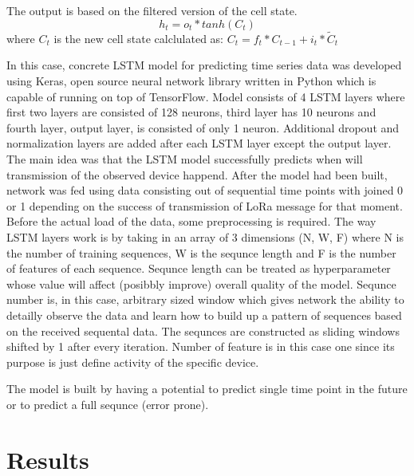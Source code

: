 \documentclass[11pt, a4paper]{article} %
\begin{document}
\begin{itemize}
	The output is based on the filtered version of the cell state.
	$$ h_{t} = o_{t} * tanh(C_{t})$$
	where 
	$ C_{t} $ is the new cell state calclulated as:
	$ C_{t} = f_{t} * C_{t-1} + i_{t} * \tilde{C}_{t} $
\end{itemize}

In this case, concrete LSTM model for predicting time series data was developed using Keras, open source neural network library written in Python which is capable of running on top of TensorFlow. 
Model consists of 4 LSTM layers where first two layers are consisted of 128 neurons, third layer has 10 neurons and fourth layer, output layer, is consisted of only 1 neuron.
Additional dropout and normalization layers are added after each LSTM layer except the output layer.  
The main idea was that the LSTM model successfully predicts when will transmission of the observed device happend. 
After the model had been built, network was fed using data consisting out of sequential time points with joined 0 or 1 depending on the success of transmission of LoRa message for that moment.
Before the actual load of the data, some preprocessing is required.
The way LSTM layers work is by taking in an array of 3 dimensions (N, W, F) where N is the number of training sequences, W is the sequnce length and F is the number of features of each sequence. 
Sequnce length can be treated as hyperparameter whose value will affect (posibbly improve) overall quality of the model. Sequnce number is, in this case, arbitrary sized window which gives network the ability to detailly observe the data and learn how to build up a pattern of sequences based on the received sequental data.  
The sequnces are constructed as sliding windows shifted by 1 after every iteration. 
Number of feature is in this case one since its purpose is just define activity of the specific device. 

The model is built by having a potential to predict single time point in the future or to predict a full sequnce (error prone).

\section{Results}
\end{document}

